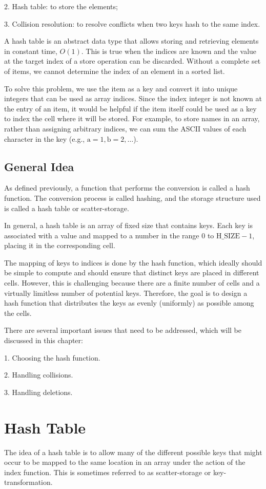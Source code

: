 2. Hash table: to store the elements; 

3. Collision resolution: to resolve conflicts when two keys hash to the same index. 

A hash table is an abstract data type that allows storing and retrieving elements in constant time, \(O(1)\). This is true when the indices are known and the value at the target index of a store operation can be discarded. Without a complete set of items, we cannot determine the index of an element in a sorted list.

To solve this problem, we use the item as a key and convert it into unique integers that can be used as array indices. Since the index integer is not known at the entry of an item, it would be helpful if the item itself could be used as a key to index the cell where it will be stored. For example, to store names in an array, rather than assigning arbitrary indices, we can sum the ASCII values of each character in the key (e.g., \(\text{a} = 1, \text{b} = 2, \dots\)).

\subsection{General Idea}
As defined previously, a function that performs the conversion is called a hash function. The conversion process is called hashing, and the storage structure used is called a hash table or scatter-storage.

In general, a hash table is an array of fixed size that contains keys. Each key is associated with a value and mapped to a number in the range \(0\) to \(\text{H\_SIZE} - 1\), placing it in the corresponding cell.

The mapping of keys to indices is done by the hash function, which ideally should be simple to compute and should ensure that distinct keys are placed in different cells. However, this is challenging because there are a finite number of cells and a virtually limitless number of potential keys. Therefore, the goal is to design a hash function that distributes the keys as evenly (uniformly) as possible among the cells.

There are several important issues that need to be addressed, which will be discussed in this chapter:

1. Choosing the hash function.

2. Handling collisions.

3. Handling deletions.

\section{Hash Table}
The idea of a hash table is to allow many of the different possible keys that might occur to be mapped to the same location in an array under the action of the index function. This is sometimes referred to as scatter-storage or key-transformation.

